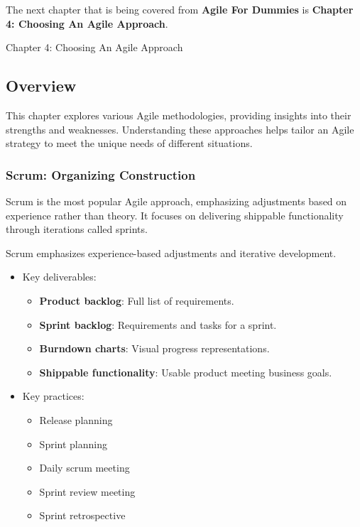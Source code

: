 The next chapter that is being covered from \textbf{Agile For Dummies} is \textbf{Chapter 4: Choosing An Agile Approach}.

\begin{notes}{Chapter 4: Choosing An Agile Approach}
    \subsection*{Overview}

    This chapter explores various Agile methodologies, providing insights into their strengths and weaknesses. Understanding these approaches helps tailor an Agile strategy to meet the unique needs 
    of different situations.
    
    \subsubsection*{Scrum: Organizing Construction}
    
    Scrum is the most popular Agile approach, emphasizing adjustments based on experience rather than theory. It focuses on delivering shippable functionality through iterations called sprints.
    
    \begin{highlight}
    
        Scrum emphasizes experience-based adjustments and iterative development.
        
        \begin{itemize}
            \item Key deliverables:
            \begin{itemize}
                \item \textbf{Product backlog}: Full list of requirements.
                \item \textbf{Sprint backlog}: Requirements and tasks for a sprint.
                \item \textbf{Burndown charts}: Visual progress representations.
                \item \textbf{Shippable functionality}: Usable product meeting business goals.
            \end{itemize}
            \item Key practices:
            \begin{itemize}
                \item Release planning
                \item Sprint planning
                \item Daily scrum meeting
                \item Sprint review meeting
                \item Sprint retrospective
            \end{itemize}
        \end{itemize}
    

\end{highlight}
\end{notes}
